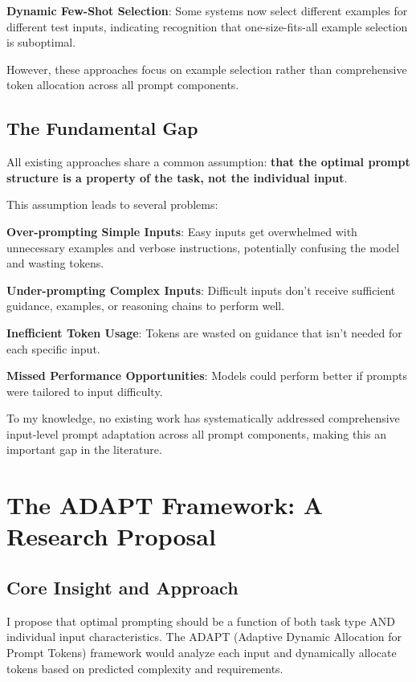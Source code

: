 \documentclass[11pt,a4paper]{article}
\begin{document}
\textbf{Dynamic Few-Shot Selection}: Some systems now select different examples for different test inputs, indicating recognition that one-size-fits-all example selection is suboptimal.

However, these approaches focus on example selection rather than comprehensive token allocation across all prompt components.

\subsection{The Fundamental Gap}

All existing approaches share a common assumption: \textbf{that the optimal prompt structure is a property of the task, not the individual input}.

This assumption leads to several problems:

\textbf{Over-prompting Simple Inputs}: Easy inputs get overwhelmed with unnecessary examples and verbose instructions, potentially confusing the model and wasting tokens.

\textbf{Under-prompting Complex Inputs}: Difficult inputs don't receive sufficient guidance, examples, or reasoning chains to perform well.

\textbf{Inefficient Token Usage}: Tokens are wasted on guidance that isn't needed for each specific input.

\textbf{Missed Performance Opportunities}: Models could perform better if prompts were tailored to input difficulty.

To my knowledge, no existing work has systematically addressed comprehensive input-level prompt adaptation across all prompt components, making this an important gap in the literature.

\section{The ADAPT Framework: A Research Proposal}

\subsection{Core Insight and Approach}

I propose that optimal prompting should be a function of both task type AND individual input characteristics. The ADAPT (Adaptive Dynamic Allocation for Prompt Tokens) framework would analyze each input and dynamically allocate tokens based on predicted complexity and requirements.
\end{document}
